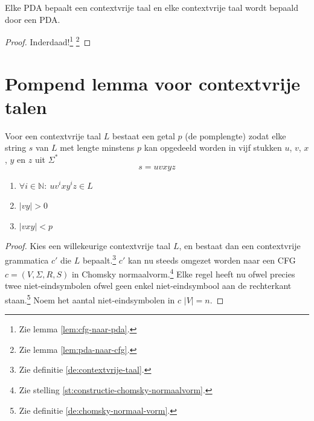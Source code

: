 \documentclass[main.tex]{subfiles}
\begin{document}
\begin{st}
  Elke PDA bepaalt een contextvrije taal en elke contextvrije taal wordt bepaald door een PDA.
 
  \begin{proof}
    Inderdaad!\footnote{Zie lemma \ref{lem:cfg-naar-pda}.} \footnote{Zie lemma \ref{lem:pda-naar-cfg}.}
  \end{proof}
\end{st}

\section{Pompend lemma voor contextvrije talen}

\begin{st}
  Voor een contextvrije taal $L$ bestaat een getal $p$ (de pomplengte) zodat elke string $s$ van $L$ met lengte minstens $p$ kan opgedeeld worden in   vijf stukken $u$, $v$, $x$, $y$ en $z$ uit $\Sigma^{*}$
  \[ s = uvxyz \]
  \begin{enumerate}
    \item $\forall i \in \mathbb{N}:\ uv^{i}xy^{i}z \in L$
    \item $|vy| > 0$
    \item $|vxy| < p$
  \end{enumerate}
  \begin{proof}
    Kies een willekeurige contextvrije taal $L$, en bestaat dan een contextvrije grammatica $c'$ die $L$ bepaalt.\footnote{Zie definitie \ref{de:contextvrije-taal}.}
    $c'$ kan nu steeds omgezet worden naar een CFG $c = (V,\Sigma,R,S)$ in Chomsky normaalvorm.\footnote{Zie stelling \ref{st:constructie-chomsky-normaalvorm}.}
    Elke regel heeft nu ofwel precies twee niet-eindsymbolen ofwel geen enkel niet-eindsymbool aan de rechterkant staan.\footnote{Zie definitie \ref{de:chomsky-normaal-vorm}.}
    Noem het aantal niet-eindsymbolen in $c$ $|V| = n$.


\end{proof}
\end{st}
\end{document}
